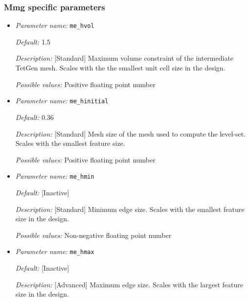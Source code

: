 \subsubsection{Mmg specific parameters} \label{parameters:mmg}
\begin{itemize}
	\item {\it Parameter name:} {\tt me\_hvol}
	\label{parameters:me_hvol}
	
	
	{\it Default:} 1.5
	
	{\it Description:} [Standard] Maximum volume constraint of the intermediate TetGen mesh. Scales with the the smallest unit cell size in the design.
	
	{\it Possible values:} Positive floating point number
	
	\item {\it Parameter name:} {\tt me\_hinitial}
	\label{parameters:me_hinitial}
	
	
	{\it Default:} 0.36
	
	{\it Description:} [Standard] Mesh size of the mesh used to compute the level-set. Scales with the smallest feature size.
	
	{\it Possible values:} Positive floating point number
	
	\item {\it Parameter name:} {\tt me\_hmin}
	\label{parameters:me_hmin}
	
	
	{\it Default:} [Inactive]
	
	{\it Description:} [Standard] Minimum edge size. Scales with the smallest feature size in the design.
	
	{\it Possible values:} Non-negative floating point number
	
	\item {\it Parameter name:} {\tt me\_hmax}
	\label{parameters:me_hmax}
	
	
	{\it Default:} [Inactive]
	
	{\it Description:} [Advanced] Maximum edge size. Scales with the largest feature size in the design.
	

\end{itemize}
